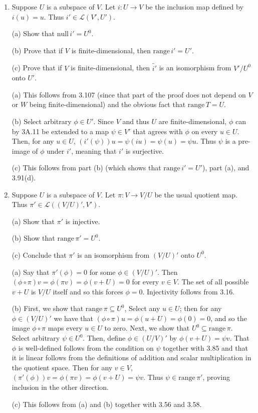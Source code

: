 \documentclass{book}
\begin{document}
\begin{enumerate}
\item Suppose \(U\) is a subspace of \(V\).  Let \(i: U \rightarrow V\) be the inclusion map defined by \(i(u)=u\).  Thus \(i' \in \mathcal{L}(V',U')\).

(a) Show that \(\textrm{null} \, i'=U^0\).

(b) Prove that if \(V\) is finite-dimensional, then \(\text{range} \, i'=U'\).

(c) Prove that if \(V\) is finite-dimensional, then \(\widetilde{i'}\) is an isomorphism from \(V'/U^0\) onto \(U'\).

(a) This follows from 3.107 (since that part of the proof does not depend on \(V\) or \(W\) being finite-dimensional) and the obvious fact that \(\text{range} \, T = U\).

(b) Select arbitrary \(\phi \in U'\).  Since \(V\) and thus \(U\) are finite-dimensional, \(\phi\) can by 3A.11 be extended to a map \(\psi \in V'\) that agrees with \(\phi\) on every \(u \in U\).  Then, for any \(u \in U\), \((i'(\psi))u=\psi(i u)=\psi(u)=\psi u\).  Thus \(\psi\) is a pre-image of \(\phi\) under \(i'\), meaning that \(i'\) is surjective.

(c) This follows from part (b) (which shows that \(\text{range} \, i'=U'\)), part (a), and 3.91(d).

\item Suppose \(U\) is a subspace of \(V\).  Let \(\pi: V \rightarrow V/U\) be the usual quotient map.  Thus \(\pi' \in \mathcal{L}((V/U)',V')\).

(a) Show that \(\pi'\) is injective.

(b) Show that \(\textrm{range} \, \pi'=U^0\).

(c) Conclude that \(\pi'\) is an isomorphism from \((V/U)'\) onto \(U^0\).

(a) Say that \(\pi'(\phi)=0\) for some \(\phi \in (V/U)'\).  Then \((\phi \circ \pi)v=\phi(\pi v)=\phi(v+U)=0\) for every \(v \in V\).  The set of all possible \(v+U\) is \(V/U\) itself and so this forces \(\phi=0\).  Injectivity follows from 3.16.

(b) First, we show that \(\text{range} \, \pi \subseteq U^0\),  Select any \(u \in U\); then for any \(\phi \in (V/U)'\) we have that \((\phi \circ \pi)u = \phi(u+U)=\phi(0)=0\), and so the image \(\phi \circ \pi\) maps every \(u \in U\) to zero.  Next, we show that \(U^0 \subseteq \text{range} \, \pi\).  Select arbitrary \(\psi \in U^0\).  Then, define \(\phi \in (U/V)'\) by \(\phi(v+U)=\psi v\).  That \(\phi\) is well-defined follows from the condition on \(\psi\) together with 3.85 and that it is linear follows from the definitions of addition and scalar multiplication in the quotient space.  Then for any \(v \in V\), \((\pi'(\phi))v = \phi(\pi v) = \phi(v+U)=\psi v\).  Thus \(\psi \in \text{range} \, \pi'\), proving inclusion in the other direction.

(c) This follows from (a) and (b) together with 3.56 and 3.58.

\end{enumerate}
\end{document}
